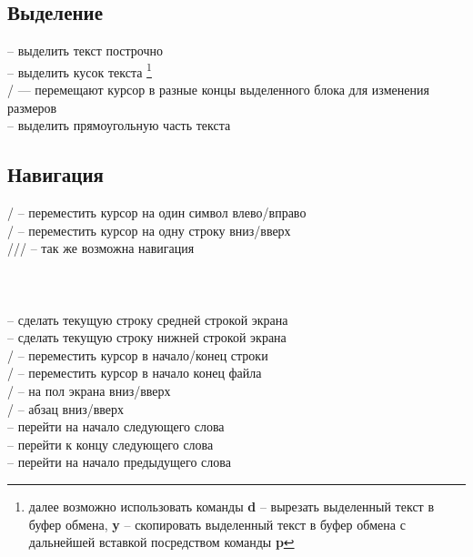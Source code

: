 \subsection*{Выделение}
\noindent
{} -- выделить текст построчно\\
 -- выделить кусок текста \footnote{далее возможно использовать команды \textbf{d} -- вырезать выделенный текст в буфер обмена, \textbf{y} -- скопировать выделенный текст в буфер обмена с дальнейшей вставкой посредством команды \textbf{p}}\\
/ — перемещают курсор в разные концы выделенного блока для изменения размеров\\
 -- выделить прямоугольную часть текста\\

\subsection*{Навигация}

\noindent
{}/ -- переместить курсор на один символ влево/вправо\\
/ -- переместить курсор на одну строку вниз/вверх\\
\keys{ \arrowkeyup }/\keys{ \arrowkeydown }/\keys{ \arrowkeyleft }/\keys{ \arrowkeyright } -- так же возможна навигация\\

\noindent
{}\\
\\
\\

\noindent
{} -- сделать текущую строку средней строкой экрана\\
 -- сделать текущую строку нижней строкой экрана\\

\noindent
{}/\keys{\$} -- переместить курсор в начало/конец строки\\
/ -- переместить курсор в начало конец файла\\
/ -- на пол экрана вниз/вверх\\
\keys{\}}/\keys{\{} -- абзац вниз/вверх\\

\noindent
{} -- перейти на начало следующего слова\\
 -- перейти к концу следующего слова\\
 -- перейти на начало предыдущего слова\\

